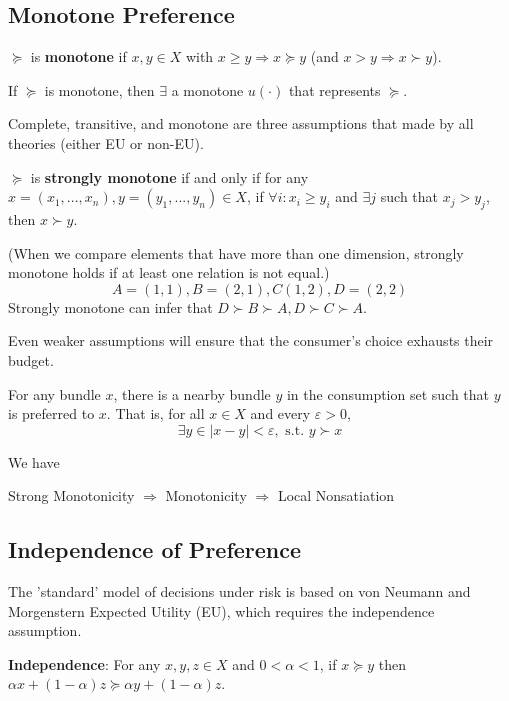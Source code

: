 \documentclass[11pt]{elegantbook}
\begin{document}
\subsection{Monotone Preference}
\begin{definition}
    \normalfont
    $\succeq$ is \textbf{monotone} if $x,y\in X$ with $x\geq y\Rightarrow x\succeq y$ (and $x> y\Rightarrow x\succ y$).
\end{definition}

\begin{proposition}
    If $\succeq$ is monotone, then $\exists$ a monotone $u(\cdot)$ that represents $\succeq$.
\end{proposition}

\begin{note}
    Complete, transitive, and monotone are three assumptions that made by all theories (either EU or non-EU).
\end{note}

\begin{definition}
    \normalfont
    $\succeq$ is \textbf{strongly monotone} if and only if for any $x=(x_1,...,x_n), y=(y_1,...,y_n)\in X$, if $\forall i: x_{i} \geq y_{i}$ and $\exists j$ such that $x_{j}>y_{j}$, then $x \succ y$.
\end{definition}
(When we compare elements that have more than one dimension, strongly monotone holds if at least one relation is not equal.)
$$
A=(1,1), B=(2,1), C(1,2), D=(2,2)
$$
Strongly monotone can infer that $D \succ B \succ A, D \succ C \succ A$.

Even weaker assumptions will ensure that the consumer's choice exhausts their budget.
\begin{definition}
    \normalfont
    For any bundle $x$, there is a nearby bundle $y$ in the consumption set such that $y$ is preferred to $x$. That is, for all $x\in X$ and every $\varepsilon>0$,
    $$
    \exists y \in|x-y|<\varepsilon, \text { s.t. } y \succ x
    $$
\end{definition}

We have
\begin{center}
    Strong Monotonicity $\Rightarrow$ Monotonicity $\Rightarrow$ Local Nonsatiation
\end{center}

\subsection{Independence of Preference}
The 'standard' model of decisions under risk is based on von Neumann and Morgenstern Expected Utility (EU), which requires the independence assumption.
\begin{definition}
    \normalfont
    \textbf{Independence}: For any $x,y,z\in X$ and $0<\alpha<1$, if $x\succeq y$ then $\alpha x+(1-\alpha)z \succeq \alpha y+(1-\alpha)z$.
\end{definition}
\end{document}
